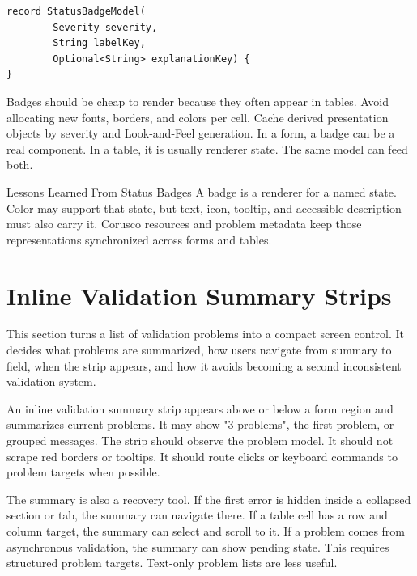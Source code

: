 \begin{lstlisting}[caption={A badge receives status metadata, not only text.}]
record StatusBadgeModel(
        Severity severity,
        String labelKey,
        Optional<String> explanationKey) {
}
\end{lstlisting}

Badges should be cheap to render because they often appear in tables. Avoid allocating
new fonts, borders, and colors per cell. Cache derived presentation objects by severity
and Look-and-Feel generation. In a form, a badge can be a real component. In a table, it
is usually renderer state. The same model can feed both.

\begin{principlebox}{Lessons Learned From Status Badges}
A badge is a renderer for a named state. Color may support that state, but text,
icon, tooltip, and accessible description must also carry it. Corusco resources
and problem metadata keep those representations synchronized across forms and
tables.
\end{principlebox}

\section{Inline Validation Summary Strips}

\begin{roadmapbox}
This section turns a list of validation problems into a compact screen control.
It decides what problems are summarized, how users navigate from summary to
field, when the strip appears, and how it avoids becoming a second inconsistent
validation system.
\end{roadmapbox}

An inline validation summary strip appears above or below a form region and summarizes
current problems. It may show "3 problems", the first problem, or grouped messages. The
strip should observe the problem model. It should not scrape red borders or tooltips. It
should route clicks or keyboard commands to problem targets when possible.

The summary is also a recovery tool. If the first error is hidden inside a collapsed
section or tab, the summary can navigate there. If a table cell has a row and column
target, the summary can select and scroll to it. If a problem comes from asynchronous
validation, the summary can show pending state. This requires structured problem
targets. Text-only problem lists are less useful.

